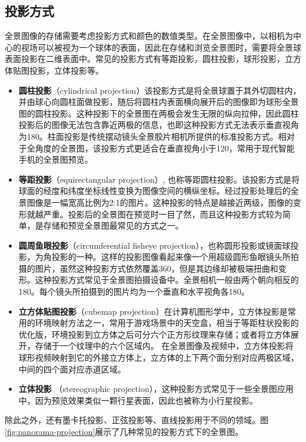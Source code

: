 \subsection{投影方式}
全景图像的存储需要考虑投影方式和颜色的数值类型。在全景图像中，以相机为中心的视场可以被视为一个球体的表面，因此在存储和浏览全景图时，需要将全景球表面投影在二维表面中。常见的投影方式有等距投影，圆柱投影，球形投影，立方体贴图投影，立体投影等。
\begin{itemize}
\item \textbf{圆柱投影}（cylindrical projection）该投影方式是将全景球置于其外切圆柱内，并由球心向圆柱面做投影，随后将圆柱内表面横向展开后的图像即为球形全景图的圆柱投影。这种投影下的全景图在两极会发生无限的纵向拉伸，因此圆柱投影后的图像无法包含靠近两极的信息，也即这种投影方式无法表示垂直视角为180。柱面投影是传统摆动镜头全景胶片相机所提供的标准投影方式。相对于全角度的全景图，该投影方式更适合在垂直视角小于120，常用于现代智能手机的全景图预览。
\item \textbf{等距投影}（equirectangular projection）, 也称等距圆柱投影。该投影方式是将球面的经度和纬度坐标线性变换为图像空间的横纵坐标。经过投影处理后的全景图像是一幅宽高比例为2:1的图片。这种投影的特点是越接近两级，图像的变形就越严重。投影后的全景图在预览时一目了然，而且这种投影方式较为简单，是存储和预览全景图最常见的方式之一。
\item \textbf{圆周鱼眼投影}（circumferential fisheye projection），也称圆形投影或镜面球投影，为角投影的一种。这样的投影图像看起来像一个用超级圆形鱼眼镜头所拍摄的图片，虽然这种投影方式依然覆盖360，但是其边缘却被极端扭曲和变形。这种投影方式常见于全景图拍摄设备中。全景相机一般由两个朝向相反的180。每个镜头所拍摄到的图片均为一个垂直和水平视角各180。
\item \textbf{立方体贴图投影}（cubemap projection）在计算机图形学中，立方体投影是常用的环境映射方法之一，常用于游戏场景中的天空盒，相当于等距柱状投影的优化版，环境投影到立方体之后可分六个正方形纹理来存储；或者将立方体展开，存储于一个纹理中的六个区域内。 
在全景图像及视频中，立方体投影将球形视频映射到它的外接立方体上，立方体的上下两个面分别对应两极区域，中间的四个面对应赤道区域。
\item \textbf{立体投影} （stereographic projection），这种投影方式常见于一些全景图应用中，因为预览效果类似一颗行星表面，因此也被称为小行星投影。
\end{itemize}

除此之外，还有墨卡托投影、正弦投影等、直线投影用于不同的领域。图\ref{fig:panorama-projection}展示了几种常见的投影方式下的全景图。

